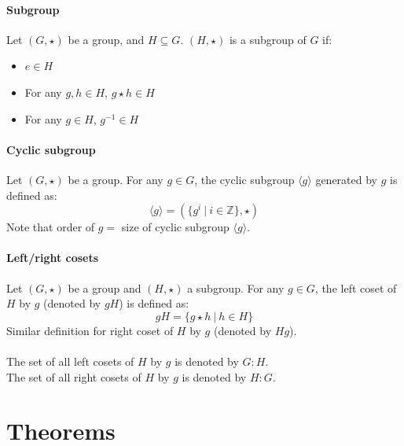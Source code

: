 \documentclass{scrartcl}
\newcommand{\Z}{\mathbb{Z}}
\begin{document}
\paragraph{Subgroup}
Let $ (G, \star) $ be a group, and $ H \subseteq G $. $ (H, \star) $ is a subgroup of $ G $ if:
\begin{itemize}
\item $ e \in H $
\item For any $ g, h \in H $,  $ g \star h \in H $
\item For any $ g \in H $, $ g^{-1} \in H $
\end{itemize}

\paragraph{Cyclic subgroup}
Let $ (G, \star) $ be a group. For any $ g \in G $, the cyclic subgroup $ \langle g \rangle $ generated by $ g $ is defined as:
\begin{equation}
\langle g \rangle = (\{g^{i} \ | \ i \in \Z \}, \star)
\end{equation}
Note that order of $ g  = $  size of cyclic subgroup $ \langle g \rangle $.

\paragraph{Left/right cosets}
Let $ (G, \star) $ be a group and $ (H, \star) $ a subgroup. For any $ g \in G $, the left coset of $ H $ by $ g $ (denoted by $ gH $) is defined as:
\begin{equation}
gH = \{g \star h \ | \ h \in H \}
\end{equation}
Similar definition for right coset of $ H $ by $ g $ (denoted by $ Hg $).
\\\\
The set of all left cosets of $ H $ by $ g $ is denoted by $ G : H $.
\\
The set of all right cosets of $ H $ by $ g $ is denoted by $ H : G $.

\section{Theorems}
\end{document}
